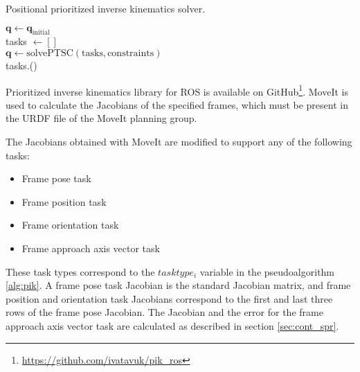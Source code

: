 \begin{algorithm}
\caption{Positional prioritized inverse kinematics solver.}\label{alg:pik}
$\boldsymbol{q} \gets \boldsymbol{q}_{\text{initial}}$\\
tasks $\gets [ ]$ \\
{
    $\boldsymbol{q} \gets \text{solvePTSC}(\text{tasks}, \text{constraints})$\\
    tasks.()\\
}
\end{algorithm}
 
Prioritized inverse kinematics library for ROS is available on GitHub\footnote{\url{https://github.com/ivatavuk/pik_ros}}. MoveIt is used to calculate the Jacobians of the specified frames, which must be present in the URDF file of the MoveIt planning group. 

The Jacobians obtained with MoveIt are modified to support any of the following tasks: 
\begin{itemize}
    \item Frame pose task
    \item Frame position task
    \item Frame orientation task
    \item Frame approach axis vector task
\end{itemize}
These task types correspond to the $tasktype_i$ variable in the pseudoalgorithm \ref{alg:pik}. A frame pose task Jacobian is the standard Jacobian matrix, and frame position and orientation task Jacobians correspond to the first and last three rows of the frame pose Jacobian. The Jacobian and the error for the frame approach axis vector task are calculated as described in section \ref{sec:cont_spr}. 

